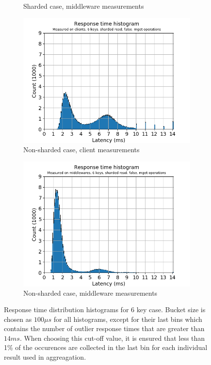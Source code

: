 \documentclass[11pt,a4paper]{article}
\begin{document}
\begin{figure}[h]
\begin{subfigure}{.5\textwidth}
  \caption{Sharded case, middleware measurements}
  \label{fig:gmg-hist6-true-mget_middlewares}
\end{subfigure}
\begin{subfigure}{.5\textwidth}
  \centering
  \includegraphics[width=1.0\linewidth ,trim={5px 0px 20px 0px},clip]{img/plot/gmg-hist6-false-mget_clients.png}
  \caption{Non-sharded case, client measurements}
  \label{fig:gmg-hist6-false-mget_clients}
\end{subfigure}%
\begin{subfigure}{.5\textwidth}
  \centering
  \includegraphics[width=1.0\linewidth ,trim={5px 0px 20px 0px},clip]{img/plot/gmg-hist6-false-mget_middlewares.png}
  \caption{Non-sharded case, middleware measurements}
  \label{fig:gmg-hist6-false-mget_middlewares}
\end{subfigure}
\caption{Response time distribution histograms for 6 key case. Bucket size is chosen as $100\mu s$ for all histograms, except for their last bins which contains the number of outlier response times that are greater than $14ms$. When choosing this cut-off value, it is ensured that less than 1\% of the occurences are collected in the last bin for each individual result used in aggreagation.}
\label{fig:gmg-hist6}
\end{figure}
\end{document}
